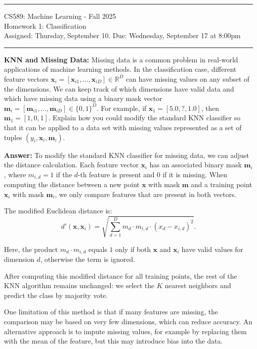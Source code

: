 \documentclass[11pt]{article}
\newcommand{\mbf}[1]{{\mathbf{#1}}}
\newenvironment{solution}{\par\noindent\textbf{Answer:} }{\par}
\begin{document}
{\centering
  \rule{6.3in}{2pt}
  \vspace{1em}
  {\Large
    CS589: Machine Learning - Fall 2025\\
    Homework 1: Classification\\
  }
  \vspace{1em}
  Assigned: Thursday, September 10. Due: Wednesday, September 17 at 8:00pm \\
  \vspace{0.1em}
  \rule{6.3in}{1.5pt}
}
\vspace{1pc}

\begin{problem}{10} \textbf{KNN and Missing Data:} Missing data is a common problem in real-world applications of machine learning methods. In the classification case, different feature vectors $\mbf{x}_i=[\mbf{x}_{i1},...,\mbf{x}_{iD}]\in\mathbb{R}^D$ can have missing values on any subset of the dimensions. We can keep track of which dimensions have valid data and which have missing data using a binary mask vector $\mbf{m}_i=[\mbf{m}_{i1},...,\mbf{m}_{iD}]\in\{0,1\}^D$. For example, if $\mbf{x}_1=[5.0, ?, 1.0]$, then $\mbf{m}_1=[1, 0, 1]$. Explain how you could modify the standard KNN classifier so that it can be applied to a data set with missing values represented as a set of tuples $(y_i,\mbf{x}_i,\mbf{m}_i)$.
\end{problem}

\begin{solution}
To modify the standard KNN classifier for missing data, we can adjust the distance calculation.  
Each feature vector $\mbf{x}_i$ has an associated binary mask $\mbf{m}_i$, where $m_{i,d}=1$ if the $d$-th feature is present and $0$ if it is missing.  
When computing the distance between a new point $\mbf{x}$ with mask $\mbf{m}$ and a training point $\mbf{x}_i$ with mask $\mbf{m}_i$, we only compare features that are present in both vectors.  

The modified Euclidean distance is:
\[
d'(\mbf{x}, \mbf{x}_i) = \sqrt{\sum_{d=1}^D m_d \cdot m_{i,d} \cdot (x_d - x_{i,d})^2 }.
\]

Here, the product $m_d \cdot m_{i,d}$ equals $1$ only if both $\mbf{x}$ and $\mbf{x}_i$ have valid values for dimension $d$, otherwise the term is ignored.  

After computing this modified distance for all training points, the rest of the KNN algorithm remains unchanged: we select the $K$ nearest neighbors and predict the class by majority vote.  

One limitation of this method is that if many features are missing, the comparison may be based on very few dimensions, which can reduce accuracy.  
An alternative approach is to impute missing values, for example by replacing them with the mean of the feature, but this may introduce bias into the data.
\end{solution}

\showpoints
\end{document}
